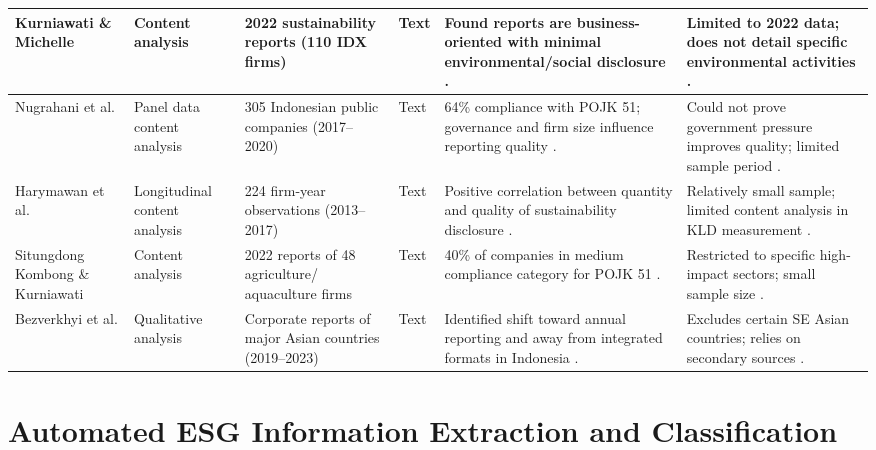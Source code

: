 \documentclass[english, online, cse, master]{dithesis}
\begin{document}
\begin{landscape}
\begin{table}[p]
\begin{tabularx}{\linewidth}{|p{2.5cm}|p{2cm}|p{3cm}|p{1.8cm}|X|X|}
Kurniawati \& Michelle  \parencite{anggreni_dian_kurniawati_938acf6c} & Content analysis & 2022 sustainability reports (110 IDX firms) & Text & Found reports are business-oriented with minimal environmental/social disclosure  \parencite{anggreni_dian_kurniawati_938acf6c}. & Limited to 2022 data; does not detail specific environmental activities  \parencite{anggreni_dian_kurniawati_938acf6c}. \\ \hline
Nugrahani et al.  \parencite{tri_siwi_nugrahani_056a6914} & Panel data content analysis & 305 Indonesian public companies (2017–2020) & Text & 64\% compliance with POJK 51; governance and firm size influence reporting quality  \parencite{tri_siwi_nugrahani_056a6914}. & Could not prove government pressure improves quality; limited sample period  \parencite{tri_siwi_nugrahani_056a6914}. \\ \hline
Harymawan et al.  \parencite{iman_harymawan_2ef898fe} & Longitudinal content analysis & 224 firm-year observations (2013–2017) & Text & Positive correlation between quantity and quality of sustainability disclosure  \parencite{iman_harymawan_2ef898fe}. & Relatively small sample; limited content analysis in KLD measurement  \parencite{iman_harymawan_2ef898fe}. \\ \hline
Situngdong Kombong \& Kurniawati  \parencite{christine_bawaeda_sitandung_kombong_d03ec902} & Content analysis & 2022 reports of 48 agriculture/ aquaculture firms & Text & 40\% of companies in medium compliance category for POJK 51  \parencite{christine_bawaeda_sitandung_kombong_d03ec902}. & Restricted to specific high-impact sectors; small sample size  \parencite{christine_bawaeda_sitandung_kombong_d03ec902}. \\ \hline
Bezverkhyi et al.  \parencite{kostiantyn_bezverkhyi_e3819b1b} & Qualitative analysis & Corporate reports of major Asian countries (2019–2023) & Text & Identified shift toward annual reporting and away from integrated formats in Indonesia  \parencite{kostiantyn_bezverkhyi_e3819b1b}. & Excludes certain SE Asian countries; relies on secondary sources  \parencite{kostiantyn_bezverkhyi_e3819b1b}. \\ \hline
\end{tabularx}
\end{table}
\end{landscape}


\section{Automated ESG Information Extraction and Classification}
\end{document}
